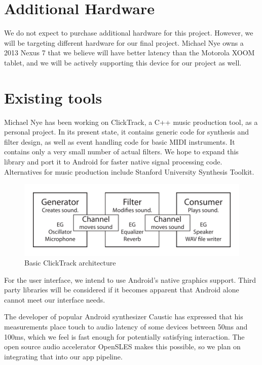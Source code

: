 \documentclass[letterpaper,12pt]{article}
\begin{document}
\section*{Additional Hardware}

We do not expect to purchase additional hardware for this project. However, we
will be targeting different hardware for our final project. Michael Nye owns
a 2013 Nexus 7 that we believe will have better latency than the Motorola 
XOOM tablet, and we will be actively supporting this device for our project as 
well.


\section*{Existing tools}

Michael Nye has been working on ClickTrack\cite{clicktrack}, a C++ music
production tool, as a personal project.  In its present state, it contains
generic code for synthesis and filter design, as well as event handling code for
basic MIDI instruments. It contains only a very small number of actual filters.
We hope to expand this library and port it to Android for faster native signal
processing code. Alternatives for music production include Stanford University
Synthesis Toolkit\cite{stk}.

\begin{figure}[h]
\centering
\includegraphics{clicktrack.pdf}
\caption{Basic ClickTrack architecture}
\label{fig:clicktrackarch}
\end{figure}


For the user interface, we intend to use Android's native graphics support.
Third party libraries will be considered if it becomes apparent that Android
alone cannot meet our interface needs.

The developer of popular Android synthesizer Caustic has expressed that his
measurements place touch to audio latency of some devices between 50ms and
100ms\cite{causticlatency}, which we feel is fast enough for potentially
satisfying interaction.  The open source audio accelerator
OpenSLES\cite{opensles} makes this possible, so we plan on integrating that into
our app pipeline.
\end{document}
